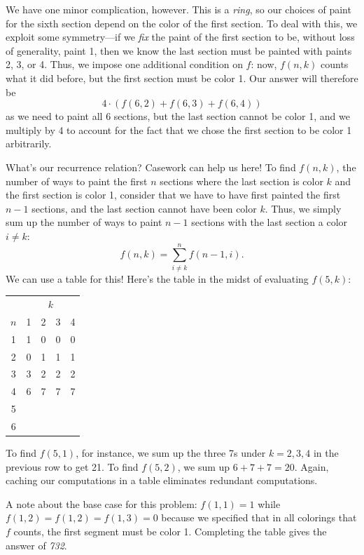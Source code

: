 \documentclass{article}
\begin{document}
We have one minor complication, however. This is a \textit{ring}, so our choices of paint for the sixth section depend on the color of the first section. To deal with this, we exploit some symmetry—if we \textit{fix} the paint of the first section to be, without loss of generality, paint 1, then we know the last section must be painted with paints 2, 3, or 4. Thus, we impose one additional condition on $f$: now, $f(n, k)$ counts what it did before, but the first section must be color 1. Our answer will therefore be
$$4 \cdot (f(6, 2) + f(6, 3) + f(6, 4))$$
as we need to paint all 6 sections, but the last section cannot be color 1, and we multiply by 4 to account for the fact that we chose the first section to be color 1 arbitrarily.

What's our recurrence relation? Casework can help us here! To find $f(n, k)$, the number of ways to paint the first $n$ sections where the last section is color $k$ and the first section is color 1, consider that we have to have first painted the first $n - 1$ sections, and the last section cannot have been color $k$. Thus, we simply sum up the number of ways to paint $n - 1$ sections with the last section a color $i \neq k$:
$$f(n, k) = \sum_{i \neq k}^{n} f(n - 1, i).$$
We can use a table for this! Here's the table in the midst of evaluating $f(5, k)$:
\begin{center}
    \begin{tabular}{c|c|c|c|c }
        \multicolumn{1}{c}{}&\multicolumn{4}{c}{\(k\)}\\
        \(n\)&1 & 2 & 3& 4 \\ \hline
        1& 1 & 0 & 0 & 0\\
        2 & 0 & 1 & 1 & 1 \\
        3& 3 & 2 & 2 & 2 \\
        4 & 6 & 7 & 7 & 7 \\
        5 & & & & \\
        6& & & & \\
    \end{tabular}
\end{center}
To find $f(5, 1)$, for instance, we sum up the three 7s under $k=2, 3, 4$ in the previous row to get 21. To find $f(5, 2)$, we sum up $6 + 7 + 7 = 20$. Again, caching our computations in a table eliminates redundant computations.

A note about the base case for this problem: $f(1, 1) = 1$ while $f(1, 2) = f(1, 2) = f(1, 3) = 0$ because we specified that in all colorings that $f$ counts, the first segment must be color 1. Completing the table gives the answer of \textit{732}.
\end{document}
